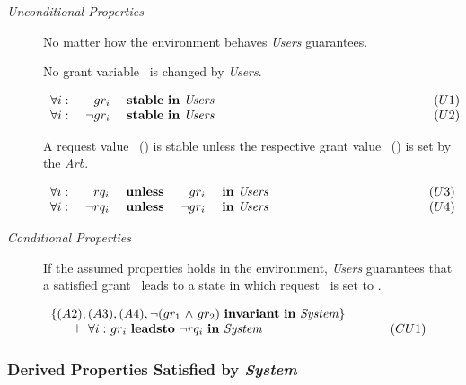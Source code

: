 \begin{description}
  \item [{\it Unconditional Properties}] \nl

      No matter how the environment behaves {\it Users} guarantees.
      
      \smallskip
      No grant variable \gri\ is changed by {\it Users}.

      \cn $\begin{array}{lrlr}
         \mforall\ & \gri\      & \stable\ \mmin\ {\it Users} & (U1)\\
         \mforall\ & \mnot\gri\ & \stable\ \mmin\ {\it Users} & 
          \hspace{165pt} (U2)\\
      \end{array}$

      A request value \rqi\ (\mnot\rqi) is stable unless the respective grant 
      value \gri\ (\mnot\gri) is set by the {\it Arb}.

      \cn $\begin{array}{lrlrlr}
        \mforall\ &      \rqi\ & \unless\ & \gri\ & \mmin\ {\it Users} & (U3)\\
        \mforall\ & \mnot\rqi\ & \unless\ & \mnot\gri\ & \mmin\ {\it Users} &
          \hspace{118pt} (U4)\\
      \end{array}$

  \item [{\it Conditional Properties}] \nl
      
      If the assumed properties holds in the environment, {\it Users}
      guarantees that a satisfied grant \gri\ leads to a state in which
      request \rqi\ is set to \mfalse.

      \cn $\begin{array}{lr}
      \{(A2), (A3), (A4),
        \mbox{$\neg$}(\mbox{$gr_1$}\ \mbox{$\wedge$}\ \mbox{$gr_2$})\ \mbox{\bf invariant}\ \mbox{\bf in}\ {\it System}\}\\
        \mbox{ \hspace{6mm}} \mbox{$\vdash$}\ \mbox{$\forall i:$}\ \mbox{$gr_{i}$}\ \mbox{\bf leadsto}\ \mbox{$\neg$} \mbox{$rq_i$}\ \mbox{\bf in}\ {\it System} &
          \hspace{26pt} (CU1)\\
      \end{array}$
\end{description}

\subsubsection{Derived Properties Satisfied by {\it System}}

